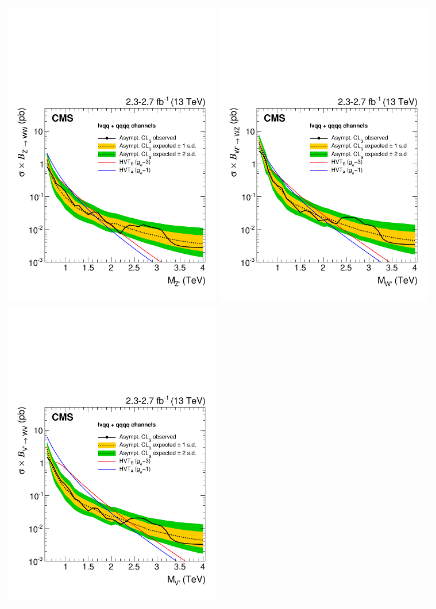 \begin{figure}[!h]
\centering
\includegraphics[width=0.49\textwidth]{figures/analysis/search1/B2G-16-004//EXOVVhvt_JJLVJZPRIME13_UL_Asymptotic_log.pdf}
\includegraphics[width=0.49\textwidth]{figures/analysis/search1/B2G-16-004//EXOVVhvt_JJLVJWPRIME13_UL_Asymptotic_log.pdf}\\     
\includegraphics[width=0.49\textwidth]{figures/analysis/search1/B2G-16-004//EXOVVhvt_JJLVJHVT13_UL_Asymptotic_log.pdf}%

\end{figure}
